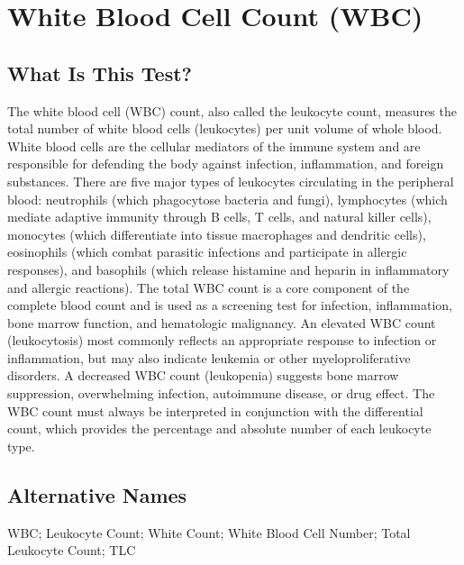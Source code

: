 \chapter{White Blood Cell Count (WBC)}

\section*{What Is This Test?}
The white blood cell (WBC) count, also called the leukocyte count, measures the total number of white blood cells (leukocytes) per unit volume of whole blood. White blood cells are the cellular mediators of the immune system and are responsible for defending the body against infection, inflammation, and foreign substances. There are five major types of leukocytes circulating in the peripheral blood: neutrophils (which phagocytose bacteria and fungi), lymphocytes (which mediate adaptive immunity through B cells, T cells, and natural killer cells), monocytes (which differentiate into tissue macrophages and dendritic cells), eosinophils (which combat parasitic infections and participate in allergic responses), and basophils (which release histamine and heparin in inflammatory and allergic reactions). The total WBC count is a core component of the complete blood count and is used as a screening test for infection, inflammation, bone marrow function, and hematologic malignancy. An elevated WBC count (leukocytosis) most commonly reflects an appropriate response to infection or inflammation, but may also indicate leukemia or other myeloproliferative disorders. A decreased WBC count (leukopenia) suggests bone marrow suppression, overwhelming infection, autoimmune disease, or drug effect. The WBC count must always be interpreted in conjunction with the differential count, which provides the percentage and absolute number of each leukocyte type.

\section*{Alternative Names}
WBC; Leukocyte Count; White Count; White Blood Cell Number; Total Leukocyte Count; TLC

